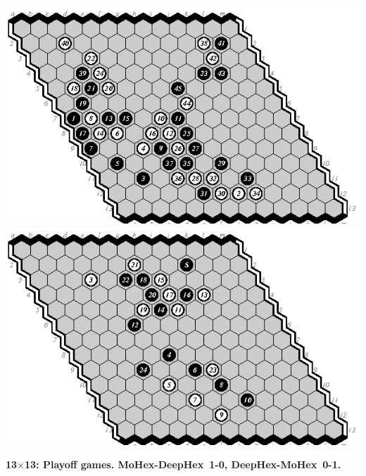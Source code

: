 \documentclass{icga}
\def\Dx{\mbox{\sc DeepHex}}
\def\Mx{\mbox{\sc MoHex}}
\begin{document}
\includegraphics[scale=1.3]{13.p01m-d.eps}\hspace*{-2.5cm}\includegraphics[scale=1.3]{13.p02d-m.swap.eps}

{\bf 13$\times$13: Playoff games. \Mx-\Dx\ 1-0, \Dx-\Mx\ 0-1.}
\end{document}
